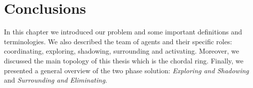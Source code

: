  \section{Conclusions}
 In this chapter we introduced our problem and some important definitions and terminologies. We also described the team of agents and their specific roles: coordinating, exploring, shadowing, surrounding and activating. Moreover, we  discussed the main topology of this thesis which is the chordal ring. Finally, we presented a general overview of the two phase solution: {\it Exploring and Shadowing} and  {\it Surrounding and Eliminating}. 

 
